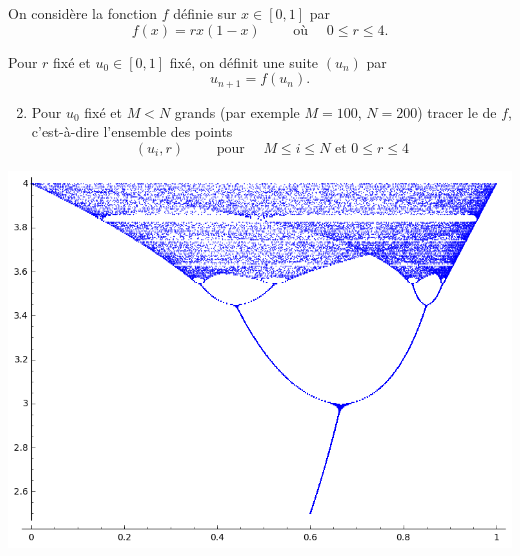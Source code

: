 \begin{frame}
\begin{tp}
On considère la fonction $f$ définie sur $x \in [0,1]$ par 
$$f(x)=rx(1-x) \qquad \text{ où } \quad 0 \le  r \le 4.$$

Pour $r$ fixé et $u_0 \in [0,1]$ fixé, on définit une suite $(u_n)$ par
$$u_{n+1} = f(u_n).$$

\pause
\begin{enumerate}
\setcounter{enumi}{1}
 \item Pour $u_0$ fixé et $M<N$ grands (par exemple $M=100$, $N=200$) tracer le  de $f$, c'est-à-dire l'ensemble des points
  $$(u_i,r) \qquad \text{ pour } \quad M \le i \le N \text{ et } 0 \le r \le 4$$
  \end{enumerate}
\end{tp}
\end{frame}


%   
% 
% 
% 

\begin{frame}
 \begin{center}
  \includegraphics[scale=0.5]{figures/chaos5}  
  \end{center} 

\end{frame}


